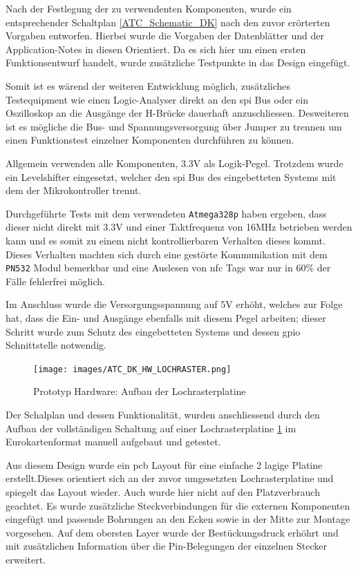 Nach der Festlegung der zu verwendenten Komponenten, wurde ein
entsprechender Schaltplan \ref{ATC_Schematic_DK} nach den zuvor
erörterten Vorgaben entworfen. Hierbei wurde die Vorgaben der
Datenblätter und der Application-Notes in diesen Orientiert. Da es sich
hier um einen ersten Funktionsentwurf handelt, wurde zusätzliche
Testpunkte in das Design eingefügt.

Somit ist es wärend der weiteren Entwicklung möglich, zusätzliches
Testequipment wie einen Logic-Analyser direkt an den \gls{spi} Bus oder
ein Oszilloskop an die Ausgänge der H-Brücke dauerhaft anzuschliessen.
Desweiteren ist es mögliche die Bus- und Spannungsversorgung über Jumper
zu trennen um einen Funktionstest einzelner Komponenten durchführen zu
können.

Allgemein verwenden alle Komponenten, 3.3V als Logik-Pegel. Trotzdem
wurde ein Levelshifter eingesetzt, welcher den \gls{spi} Bus des
eingebetteten Systems mit dem der Mikrokontroller trennt.

Durchgeführte Tests mit dem verwendeten
\passthrough{\lstinline!Atmega328p!} haben ergeben, dass dieser nicht
direkt mit 3.3V und einer Taktfrequenz von 16MHz betrieben werden kann
und es somit zu einem nicht kontrollierbaren Verhalten dieses kommt.
Dieses Verhalten machten sich durch eine gestörte Kommunikation mit dem
\passthrough{\lstinline!PN532!} Modul bemerkbar und eine Auslesen von
\gls{nfc} Tags war nur in 60\% der Fälle fehlerfrei möglich.

Im Anschluss wurde die Versorgungsspannung auf 5V erhöht, welches zur
Folge hat, dass die Ein- und Ausgänge ebenfalls mit diesem Pegel
arbeiten; dieser Schritt wurde zum Schutz des eingebetteten Systems und
dessen \gls{gpio} Schnittstelle notwendig.

\begin{figure}
\centering
\texttt{[image: images/ATC\_DK\_HW\_LOCHRASTER.png]}
\caption{Prototyp Hardware: Aufbau der Lochrasterplatine
\label{ATC_DK_HW_LOCHRASTER}}
\end{figure}

Der Schalplan und dessen Funktionalität, wurden anschliessend durch den
Aufbau der vollständigen Schaltung auf einer Lochrasterplatine
\ref{ATC_DK_HW_LOCHRASTER} im Eurokartenformat manuell aufgebaut und
getestet.

Aus diesem Design wurde ein \gls{pcb} Layout für eine einfache 2 lagige
Platine erstellt.Dieses orientiert sich an der zuvor umgesetzten
Lochrasterplatine und spiegelt das Layout wieder. Auch wurde hier nicht
auf den Platzverbrauch geachtet. Es wurde zusätzliche Steckverbindungen
für die externen Komponenten eingefügt und passende Bohrungen an den
Ecken sowie in der Mitte zur Montage vorgesehen. Auf dem obersten Layer
wurde der Bestückungsdruck erhöhrt und mit zusätzlichen Information über
die Pin-Belegungen der einzelnen Stecker erweitert.

